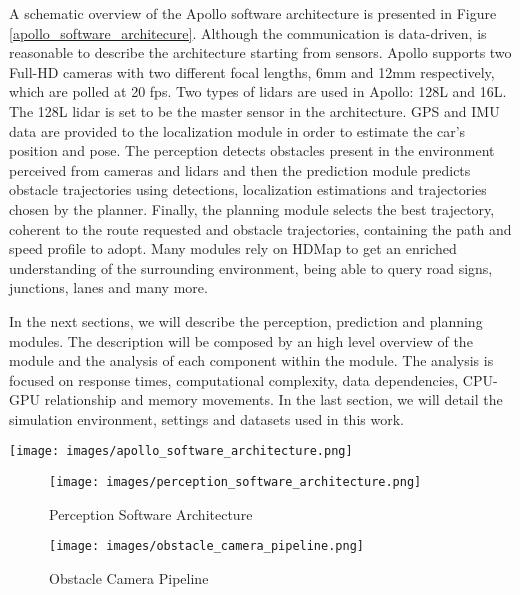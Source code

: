 \documentclass[conference]{IEEEtran}
\begin{document}
A schematic overview of the Apollo software architecture is presented in Figure \ref{apollo_software_architecure}.
Although the communication is data-driven, is reasonable to describe the architecture starting from sensors.
Apollo supports two Full-HD cameras with two different focal lengths, 6mm and 12mm respectively, which are polled at 20 fps.
Two types of lidars are used in Apollo: 128L and 16L. The 128L lidar is set to be the master sensor in the architecture.
GPS and IMU data are provided to the localization module in order to estimate the car's position and pose.
The perception detects obstacles present in the environment perceived from cameras and lidars and then the prediction module predicts obstacle trajectories using detections, localization estimations and trajectories chosen by the planner.
Finally, the planning module selects the best trajectory, coherent to the route requested and obstacle trajectories, containing the path and speed profile to adopt.
Many modules rely on HDMap to get an enriched understanding of the surrounding environment, being able to query road signs, junctions, lanes and many more. 

In the next sections, we will describe the perception, prediction and planning modules.
The description will be composed by an high level overview of the module and the analysis of each component within the module.
The analysis is focused on response times, computational complexity, data dependencies, CPU-GPU relationship and memory movements.
In the last section, we will detail the simulation environment, settings and datasets used in this work.

\begin{figure*}[t]
    \centering
    \texttt{[image: images/apollo\_software\_architecture.png]}
    \caption{Apollo Software Architecture}
    \label{apollo_software_architecure}
\end{figure*}

\begin{figure*}[b!]
    \centering
    \begin{subfigure}{\columnwidth}
        \centering
        \texttt{[image: images/perception\_software\_architecture.png]}
        \caption{Perception Software Architecture}
        \label{perception_software_architecture}
    \end{subfigure}
    \begin{subfigure}{\columnwidth}
        \centering
        \texttt{[image: images/obstacle\_camera\_pipeline.png]}
        \caption{Obstacle Camera Pipeline}
        \label{obstacle_camera_pipeline}
    \end{subfigure}
    \caption{}
\end{figure*}
\end{document}
